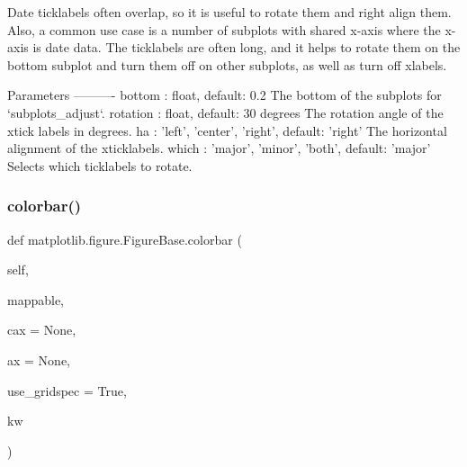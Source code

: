 \begin{DoxyVerb}Date ticklabels often overlap, so it is useful to rotate them
and right align them.  Also, a common use case is a number of
subplots with shared x-axis where the x-axis is date data.  The
ticklabels are often long, and it helps to rotate them on the
bottom subplot and turn them off on other subplots, as well as
turn off xlabels.

Parameters
----------
bottom : float, default: 0.2
    The bottom of the subplots for `subplots_adjust`.
rotation : float, default: 30 degrees
    The rotation angle of the xtick labels in degrees.
ha : {'left', 'center', 'right'}, default: 'right'
    The horizontal alignment of the xticklabels.
which : {'major', 'minor', 'both'}, default: 'major'
    Selects which ticklabels to rotate.
\end{DoxyVerb}
 \mbox{\label{classmatplotlib_1_1figure_1_1FigureBase_a2965a716949deee10d58ff0a97419c8c}} 
\subsubsection{\texorpdfstring{colorbar()}{colorbar()}}
{\footnotesize\ttfamily def matplotlib.\+figure.\+Figure\+Base.\+colorbar (\begin{DoxyParamCaption}\item[{}]{self,  }\item[{}]{mappable,  }\item[{}]{cax = {\ttfamily None},  }\item[{}]{ax = {\ttfamily None},  }\item[{}]{use\+\_\+gridspec = {\ttfamily True},  }\item[{}]{kw }\end{DoxyParamCaption})}

